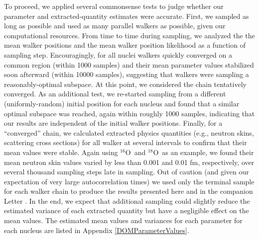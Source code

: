 \documentclass[twocolumn,secnumarabic,amssymb, nobibnotes, aps, prl,
superscriptaddress, nobalancelastpage, draft]{revtex4}
\newcommand{\oSix}{\ensuremath{^{16}}O}
\newcommand{\oEight}{\ensuremath{^{18}}O}
\begin{document}
To proceed, we applied several commonsense tests to
judge whether our parameter and extracted-quantity estimates were accurate.
First, we sampled as long as possible and used as many parallel walkers as
possible, given our computational resources. From time to time during sampling,
we analyzed the the mean walker positions and the mean walker position likelihood
as a function of sampling step. Encouragingly, for all nuclei walkers quickly
converged on a common region (within 1000 samples) and their mean parameter
values stabilized soon afterward (within 10000 samples), suggesting that walkers
were sampling a reasonably-optimal subspace. At this point, we considered the chain
tentatively converged. As an additional test, we re-started sampling from a different
(uniformly-random) initial position for each nucleus and found that a similar
optimal subspace was reached, again within roughly 1000 samples, indicating that
our results are independent of the initial walker positions. Finally, for a
``converged'' chain, we calculated extracted physics quantities (e.g., neutron
skins, scattering cross sections) for all walker at several intervals
to confirm that their mean values were stable. Again using \oSix\ and \oEight\ as
an example, we found their mean neutron skin values varied by less
than 0.001 and 0.01 fm, respectively, over several thousand sampling steps late
in sampling. Out of caution (and given our expectation of very large autocorrelation times)
we used only the terminal sample for each walker chain to produce
the results presented here and in the companion Letter \cite{Pruitt2020PRL}.
In the end, we expect that additional sampling could slightly
reduce the estimated variance of each extracted quantity but have a negligible
effect on the mean values. The estimated mean values and variances for each
parameter for each nucleus are listed in Appendix \ref{DOMParameterValues}.
\end{document}
